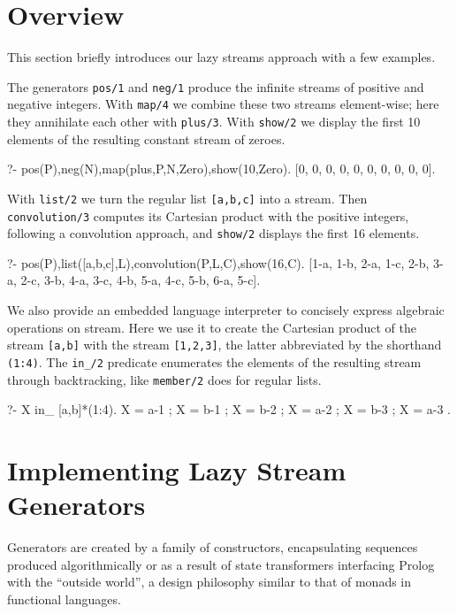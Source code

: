 \documentclass{new_tlp}
\begin{document}
\section{Overview}\label{ov}

This section briefly introduces our lazy streams approach with a few examples.

The generators {\tt pos/1} and {\tt neg/1} produce the infinite streams of positive
and negative integers. With {\tt map/4} we combine these two streams element-wise;
here they annihilate each other with {\tt plus/3}. With {\tt show/2} we display
the first 10 elements of the resulting constant stream of zeroes.
\begin{codex}
?- pos(P),neg(N),map(plus,P,N,Zero),show(10,Zero).
[0, 0, 0, 0, 0, 0, 0, 0, 0, 0].
\end{codex}
With \texttt{list/2} we turn the regular list \texttt{[a,b,c]} into a stream.
Then {\tt convolution/3} computes its Cartesian product with the positive
integers, following a convolution approach, and {\tt show/2} displays the first 16 elements. 
\begin{codex}
?- pos(P),list([a,b,c],L),convolution(P,L,C),show(16,C).
[1-a, 1-b, 2-a, 1-c, 2-b, 3-a, 2-c, 3-b, 4-a, 3-c, 4-b, 5-a, 4-c, 5-b, 6-a, 5-c].
\end{codex}
We also provide an embedded language interpreter to concisely 
express algebraic operations on stream. Here we use it to create
the Cartesian product of the stream \texttt{[a,b]} with the stream
\texttt{[1,2,3]}, the latter abbreviated by the shorthand \texttt{(1:4)}.
The \texttt{in\_/2} predicate enumerates the elements of the resulting stream
through backtracking, like \texttt{member/2} does for regular lists.
\begin{codex}
?- X in_ [a,b]*(1:4).
X = a-1 ; X = b-1 ; X = b-2 ; X = a-2 ; X = b-3 ; X = a-3 .
\end{codex}
     

\section{Implementing Lazy Stream Generators}\label{impl}
  
Generators are created by a family of constructors, encapsulating sequences
produced algorithmically or as a result of state transformers interfacing
Prolog with the ``outside world'', a design philosophy similar to that of
monads in functional languages.
\end{document}
